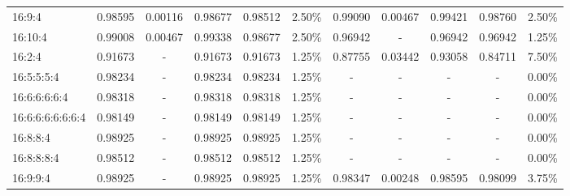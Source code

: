 \documentclass[spanish,a4paper,12pt,twoside]{report}
\begin{document}
\begin{landscape}
\begin{center}
\begin{tabular}{l c c c c r c c c c r}
        16:9:4 & 0.98595 & 0.00116 & 0.98677 & 0.98512 & 2.50\% & 0.99090 & 0.00467 & 0.99421 & 0.98760 & 2.50\% \\
        16:10:4 & 0.99008 & 0.00467 & 0.99338 & 0.98677 & 2.50\% & 0.96942 & - & 0.96942 & 0.96942 & 1.25\% \\ 
        16:2:4 & 0.91673 & - & 0.91673 & 0.91673 & 1.25\% & 0.87755 & 0.03442 & 0.93058 & 0.84711 & 7.50\% \\
        16:5:5:5:4 & 0.98234 & - & 0.98234 & 0.98234 & 1.25\% & - & - & - & - & 0.00\% \\
        16:6:6:6:6:4 & 0.98318 & -& 0.98318 & 0.98318 & 1.25\% & - & - & - & - & 0.00\% \\
        16:6:6:6:6:6:6:4 & 0.98149 &- & 0.98149 & 0.98149 & 1.25\% & - & - & - & - & 0.00\% \\
        16:8:8:4 & 0.98925 & - & 0.98925 & 0.98925 & 1.25\% & - & - & - & - & 0.00\% \\
        16:8:8:8:4 & 0.98512 & - & 0.98512 & 0.98512 & 1.25\% & - & - & - & - & 0.00\% \\
        16:9:9:4 & 0.98925 & - & 0.98925 & 0.98925 & 1.25\% & 0.98347 & 0.00248 & 0.98595 & 0.98099 & 3.75\% \\[1ex]
        \hline
      \end{tabular}
    \end{center}
  \end{landscape} \par
\end{document}
